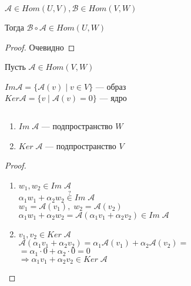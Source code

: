 \begin{theorem-non}
    $\mathcal{A} \in Hom(U, V), \mathcal{B} \in Hom(V, W)$

    Тогда $\mathcal{B} \circ \mathcal{A} \in Hom(U,W)$

    \begin{proof}
        Очевидно
    \end{proof}

\end{theorem-non}

\begin{conj}
    Пусть $\mathcal{A} \in Hom(V,W)$

    \begin{center}
        $Im \mathcal{A} = \{ \mathcal{A}(v) \;|\; v \in V \}$ --- образ \\
        $Ker \mathcal{A} = \{ v \;|\; \mathcal{A}(v) = 0 \}$ --- ядро
    \end{center}

\end{conj}

\begin{theorem-non}
    $ $ 

    \begin{enumerate}
        \item $Im \; \mathcal{A}$ --- подпространство $W$
        \item $Ker \; \mathcal{A}$ --- подпространство $V$
    \end{enumerate}
    
    \begin{proof}
        $ $

        \begin{enumerate}
            \item 
            \begin{flushleft}
                $w_1, w_2 \in Im \; \mathcal{A}$ \\
                $\alpha_1w_1 + \alpha_2w_2 \stackrel{?}{\in} Im \; \mathcal{A}$ \\
                $w_1 = \mathcal{A}(v_1),\; w_2 = \mathcal{A}(v_2)$ \\
                $\alpha_1w_1 + \alpha_2w_2 = \mathcal{A}(\alpha_1v_1 + \alpha_2v_2) \in Im \; \mathcal{A}$ 
            \end{flushleft}
            \item
            \begin{flushleft}
                $v_1, v_2 \in Ker \; \mathcal{A}$ \\
                $\mathcal{A}(\alpha_1v_1 + \alpha_2v_2) = \alpha_1 \mathcal{A}(v_1) + \alpha_2 \mathcal{A}(v_2) = $ \\
                $ = \alpha_1 \cdot 0 + \alpha_2 \cdot 0 = 0$ \\
                $ \Longrightarrow \alpha_1 v_1 + \alpha_2 v_2 \in Ker \; \mathcal{A}$
            \end{flushleft}
        \end{enumerate}

    \end{proof}

\end{theorem-non}

